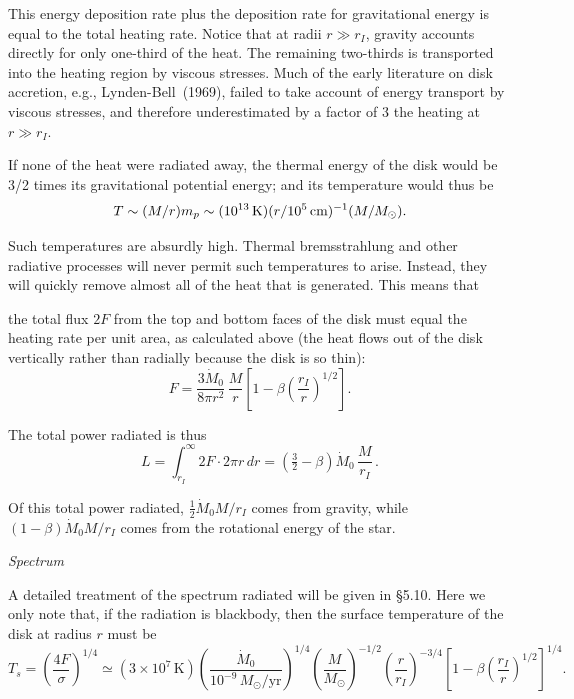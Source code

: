 This energy deposition rate plus the deposition rate for gravitational energy is
equal to the total heating rate. Notice that at radii $r \gg r_I$, gravity accounts
directly for only one-third of the heat. The remaining two-thirds is transported
into the heating region by viscous stresses. Much of the early literature on disk
accretion, e.g., Lynden-Bell~(1969)\cite{LyndenBell1969}, failed to take account of energy transport
by viscous stresses, and therefore underestimated by a factor of 3 the heating at
$r \gg r_I$.

If none of the heat were radiated away, the thermal energy of the disk
would be 3/2 times its gravitational potential energy; and its temperature
would thus be
\begin{equation}
T \sim (M/r) m_p \sim (10^{13}\,\text{K})(r/10^5\,\text{cm})^{-1}(M/M_\odot).
\notag
\end{equation}

Such temperatures are absurdly high. Thermal bremsstrahlung and other
radiative processes will never permit such temperatures to arise. Instead, they
will quickly remove almost all of the heat that is generated. This means that

the total flux $2F$ from the top and bottom faces of the disk must equal the
heating rate per unit area, as calculated above (the heat flows out of the disk
vertically rather than radially because the disk is so thin):
\begin{equation}
F = \frac{3\dot{M}_0}{8\pi r^2}\,\frac{M}{r}
\left[1 - \beta\!\left(\frac{r_I}{r}\right)^{1/2}\right].
\tag{5.2.21}
\end{equation}

The total power radiated is thus
\begin{equation}
L = \int_{r_I}^{\infty} 2F \cdot 2\pi r\,dr
= (\tfrac{3}{2} - \beta)\dot{M}_0\,\frac{M}{r_I}\,.
\tag{5.2.22}
\end{equation}

Of this total power radiated, $\tfrac{1}{2}\dot{M}_0 M/r_I$ comes from gravity, while $(1 - \beta)\dot{M}_0 M/r_I$
comes from the rotational energy of the star.

\textit{Spectrum}

A detailed treatment of the spectrum radiated will be given in \S5.10. Here we
only note that, if the radiation is blackbody, then the surface temperature of
the disk at radius $r$ must be
\begin{equation}
T_s = \left(\frac{4F}{\sigma}\right)^{1/4}
\simeq (3 \times 10^7\,\text{K})
\left(\frac{\dot{M}_0}{10^{-9}\,M_\odot/\text{yr}}\right)^{1/4}
\!\left(\frac{M}{M_\odot}\right)^{-1/2}
\!\left(\frac{r}{r_I}\right)^{-3/4}
\left[1 - \beta\!\left(\frac{r_I}{r}\right)^{1/2}\right]^{1/4}\!.
\tag{5.2.23}
\end{equation}

